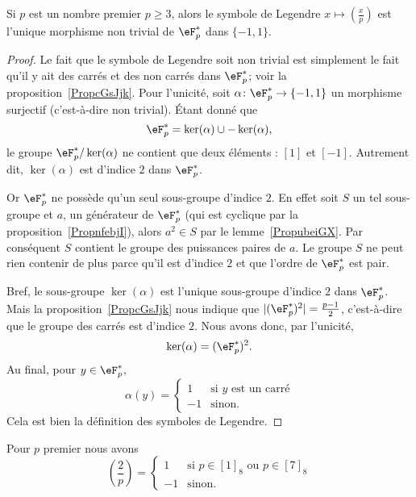 \begin{lemma}\label{Lemoabzrn}
    Si \( p\) est un nombre premier \( p\geq 3\), alors le symbole de Legendre \( x\mapsto\left(\frac{x}{p}\right)\) est l'unique morphisme non trivial de \( \eF^*_p\) dans \( \{ -1,1 \}\).
\end{lemma}

\begin{proof}
    Le fait que le symbole de Legendre soit non trivial est simplement le fait qu'il y ait des carrés et des non carrés dans \( \eF_p^*\); voir la proposition~\ref{PropcGsJjk}. Pour l'unicité, soit \( \alpha\colon \eF^*_p\to \{ -1,1 \}\) un morphisme surjectif (c'est-à-dire non trivial). Étant donné que
    \begin{equation}
        \eF^*_p=\ker(\alpha)\cup-\ker(\alpha),
    \end{equation}
    le groupe \( \eF_p^*/\ker(\alpha)\) ne contient que deux éléments : \( [1]\) et \( [-1]\). Autrement dit, \( \ker(\alpha)\) est d'indice \( 2\) dans \( \eF_p^*\).

    Or \( \eF_p^*\) ne possède qu'un seul sous-groupe d'indice \( 2\). En effet soit \( S\) un tel sous-groupe et \( a\), un générateur de \( \eF_p^*\) (qui est cyclique par la proposition~\ref{PropnfebjI}), alors \( a^2\in S\) par le lemme~\ref{PropubeiGX}. Par conséquent \( S\) contient le groupe des puissances paires de \( a\). Le groupe $S$ ne peut rien contenir de plus parce qu'il est d'indice \( 2\) et que l'ordre de \( \eF_p^*\) est pair.

    Bref, le sous-groupe \( \ker(\alpha)\) est l'unique sous-groupe d'indice \( 2\) dans \( \eF_p^*\). Mais la proposition~\ref{PropcGsJjk} nous indique que \( | (\eF_p^*)^2 |=\frac{ p-1 }{2}\), c'est-à-dire que le groupe des carrés est d'indice \( 2\). Nous avons donc, par l'unicité,
    \begin{equation}
        \ker(\alpha)=(\eF_p^*)^2.
    \end{equation}
    Au final, pour \( y\in \eF_p^*\),
    \begin{equation}
        \alpha(y)=\begin{cases}
           1 &   \text{si } y\text{ est un carré}\\
            -1    &    \text{sinon.}
        \end{cases}
    \end{equation}
    Cela est bien la définition des symboles de Legendre.
\end{proof}

\begin{proposition}
    Pour \( p\) premier nous avons
    \begin{equation}
        \left(\frac{2}{p}\right)=\begin{cases}
            1    &   \text{si } p\in [1]_8\text{ ou } p\in [7]_8\\
            -1    &    \text{sinon}.
        \end{cases}
    \end{equation}
\end{proposition}

